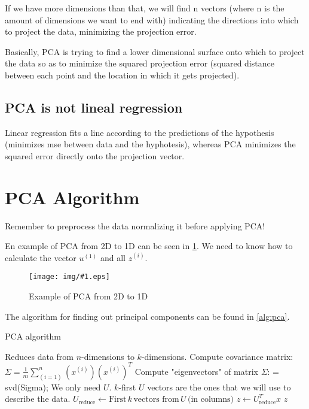 \documentclass[10pt]{extarticle}
\newcommand{\stdfig}[2]{
    \begin{figure}
    \centering
    \texttt{[image: img/\#1.eps]}
    \caption{#2}
    \label{fig:#1}
    \end{figure}
}
\begin{document}
If we have more dimensions than that, we will find n vectors (where n is
the amount of dimensions we want to end with) indicating the directions
into which to project the data, minimizing the projection error.
\smallskip

Basically, PCA is trying to find a lower dimensional surface onto which
to project the data so as to minimize the squared projection error
(squared distance between each point and the location in which it gets
projected).

\subsection{PCA is not lineal
regression}\label{pca-is-not-lineal-regression}

Linear regression fits a line according to the predictions of the
hypothesis (minimizes mse between data and the hyphotesis), whereas PCA
minimizes the squared error directly onto the projection vector.

\section{PCA Algorithm}\label{pca-algorithm}

Remember to preprocess the data normalizing it before applying PCA!
\smallskip

En example of PCA from 2D to 1D can be seen in \cref{fig:pca_2d_to_1d}.
We need to know how to calculate the vector $u^{(1)}$ and all $z^{(i)}$.
\smallskip

\stdfig{pca_2d_to_1d}{Example of PCA from 2D to 1D}

The algorithm for finding out principal components can be found in
\cref{alg:pca}.

\begin{algorithm}
\caption{PCA algorithm}\label{alg:pca}
\begin{algorithmic}[1]
 
    \State Reduces data from $n$-dimensions to $k$-dimensions.
    \State Compute covariance matrix:
        \State \indent $\Sigma = \frac{1}{m} \sum_{(i=1)}^n (x^{(i)})(x^{(i)})^T$
    \State Compute "eigenvectors" of matrix $\Sigma$:
        \State \indent [$U, S, V$] = svd(Sigma);  
        \State \indent We only need $U$. $k$-first $U$ vectors are the ones that we will use to describe the data.
        \State \indent $U_{\text{reduce}} \gets \text{First} \, k \, \text{vectors from} \, U \, \text{(in columns)}$
    \State $z \gets U_{\text{reduce}}^T x$
    \State \Return $z$
\EndFunction
\end{algorithmic}
\end{algorithm}
\end{document}
